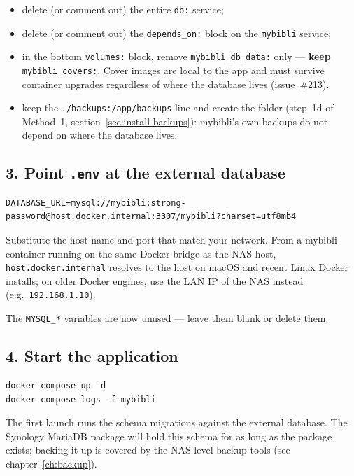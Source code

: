 \begin{itemize}
  \item delete (or comment out) the entire \texttt{db:} service;
  \item delete (or comment out) the \texttt{depends\_on:} block on
        the \texttt{mybibli} service;
  \item in the bottom \texttt{volumes:} block, remove
        \texttt{mybibli\_db\_data:} only — \textbf{keep}
        \texttt{mybibli\_covers:}. Cover
        images are local to the app and must survive container
        upgrades regardless of where the database lives (issue~\#213).
  \item keep the \texttt{./backups:/app/backups} line and create the
        folder (step~1d of Method~1, section~\ref{sec:install-backups}):
        mybibli's own backups do not depend on where the database lives.
\end{itemize}

\subsection*{3. Point \texttt{.env} at the external database}

\begin{lstlisting}
DATABASE_URL=mysql://mybibli:strong-password@host.docker.internal:3307/mybibli?charset=utf8mb4
\end{lstlisting}

Substitute the host name and port that match your network. From a
mybibli container running on the same Docker bridge as the NAS host,
\texttt{host.docker.internal} resolves to the host on macOS and
recent Linux Docker installs; on older Docker engines, use the LAN
IP of the NAS instead (e.g.\ \texttt{192.168.1.10}).

The \texttt{MYSQL\_*} variables are now unused — leave them blank or
delete them.

\subsection*{4. Start the application}

\begin{lstlisting}
docker compose up -d
docker compose logs -f mybibli
\end{lstlisting}

The first launch runs the schema migrations against the external
database. The Synology MariaDB package will hold this schema for as
long as the package exists; backing it up is covered by the NAS-level
backup tools (see chapter~\ref{ch:backup}).

